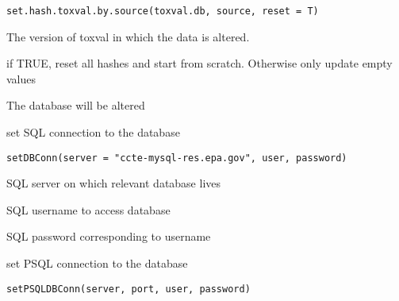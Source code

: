 \documentclass[letterpaper]{book}
\begin{document}
%
\begin{Usage}
\begin{verbatim}
set.hash.toxval.by.source(toxval.db, source, reset = T)
\end{verbatim}
\end{Usage}
%
\begin{Arguments}
\begin{ldescription}
\item[\code{toxval.db}] The version of toxval in which the data is altered.

\item[\code{do.reset}] if TRUE, reset all hashes and start from scratch.
Otherwise only update empty values
\end{ldescription}
\end{Arguments}
%
\begin{Value}
The database will be altered
\end{Value}
%
\begin{Description}\relax
set SQL connection to the database
\end{Description}
%
\begin{Usage}
\begin{verbatim}
setDBConn(server = "ccte-mysql-res.epa.gov", user, password)
\end{verbatim}
\end{Usage}
%
\begin{Arguments}
\begin{ldescription}
\item[\code{server}] SQL server on which relevant database lives

\item[\code{user}] SQL username to access database

\item[\code{password}] SQL password corresponding to username
\end{ldescription}
\end{Arguments}
%
\begin{Description}\relax
set PSQL connection to the database
\end{Description}
%
\begin{Usage}
\begin{verbatim}
setPSQLDBConn(server, port, user, password)
\end{verbatim}
\end{Usage}
\end{document}
